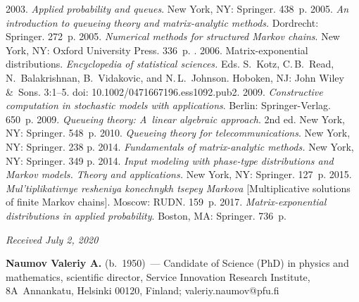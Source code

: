 \begin{multicols}{2}
{{\begin{thebibliography}{99}
   2003. \textit{Applied probability and queues}. New  York, NY: Springer. 
438~p.
   2005. \textit{An introduction to queueing theory and 
  matrix-analytic methods.} Dordrecht: Springer. 272~p.
   2005. \textit{Numerical methods for structured 
Markov chains}. New  York, NY: Oxford University Press. 336~p.
  . 2006. Matrix-exponential distributions. 
\textit{Encyclopedia of statistical sciences.} Eds. S.~Kotz, C.\,B.~Read, N.~Balakrishnan, 
B.~Vidakovic, and N.\,L.~Johnson. Hoboken, NJ: John Wiley \&~Sons. 3:1--5. doi: 10.1002/0471667196.ess1092.pub2.
   2009. \textit{Constructive computation in stochastic models with applications}. 
Berlin: 
  Springer-Verlag. 650~p.
   2009. \textit{Queueing theory: A~linear algebraic approach}. 2nd ed. New York, 
NY: Springer. 548~p.
   2010. \textit{Queueing theory for telecommunications}. New York, NY: 
Springer. 238 p.
   2014. \textit{Fundamentals of matrix-analytic methods.} New York, NY: 
Springer. 349 p.
   2014. \textit{Input modeling with phase-type 
distributions and Markov models. Theory and applications.} New York, NY: Springer. 127~p.
   2015. \textit{Mul'tiplikativnye 
resheniya konechnykh tsepey Markova} [Multiplicative solutions of finite Markov chains]. Moscow: 
RUDN. 159~p.
   2017. \textit{Matrix-exponential distributions in applied 
probability}. Boston, MA: Springer. 736~p.
\end{thebibliography}

 }
 }

\end{multicols}

\vspace*{-3pt}

\hfill{\small\textit{Received July 2, 2020}}


  
  \Contr
  
  \noindent
  \textbf{Naumov Valeriy A.} (b.\ 1950)~--- Candidate of Science (PhD) in physics and mathematics, 
scientific director, Service Innovation Research Institute, 8A~Annankatu, Helsinki 00120, Finland; 
\mbox{valeriy.naumov@pfu.fi}
  
